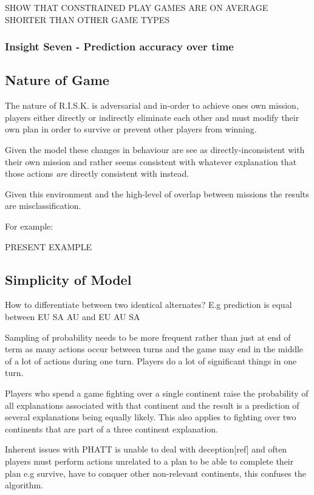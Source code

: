 \documentclass[parskip]{cs4rep}
\begin{document}
SHOW THAT CONSTRAINED PLAY GAMES ARE ON AVERAGE SHORTER THAN OTHER GAME TYPES

\subsubsection{Insight Seven - Prediction accuracy over time}

\subsection{Nature of Game}

The nature of R.I.S.K. is adversarial and in-order to achieve ones own mission, players either directly or indirectly eliminate each other and must modify their own plan in order to survive or prevent other players from winning. 

Given the model these changes in behaviour are see as directly-inconsistent with their own mission and rather seems consistent with whatever explanation that those actions \textit{are} directly consistent with instead.

Given this environment and the high-level of overlap between missions the results are misclassification.

For example:

PRESENT EXAMPLE

\subsection{Simplicity of Model}

How to differentiate between two identical alternates? E.g prediction is equal between EU SA AU and EU AU SA 

Sampling of probability needs to be more frequent rather than just at end of term as many actions occur between turns and the game may end in the middle of a lot of actions during one turn. Players do a lot of significant things in one turn.

Players who spend a game fighting over a single continent raise the probability of all explanations associated with that continent and the result is a prediction of several explanations being equally likely. This also applies to fighting over two continents that are part of a three continent explanation.

Inherent issues with PHATT is unable to deal with deception[ref] and often players must perform actions unrelated to a plan to be able to complete their plan e.g survive, have to conquer other non-relevant continents, this confuses the algorithm.
\end{document}
